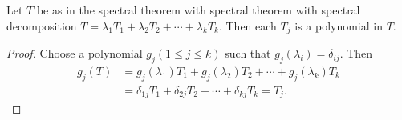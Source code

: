 \begin{corollary}
    Let \( T  \) be as in the spectral theorem with spectral theorem with spectral decomposition \( T = {\lambda}_{1} {T}_{1} + {\lambda}_{2} {T}_{2} + \cdots + {\lambda}_{k} {T}_{k} \). Then each \( {T}_{j} \) is a polynomial in \( T  \).
\end{corollary}
\begin{proof}
Choose a polynomial \( {g}_{j} (1 \leq j \leq k)  \) such that \( {g}_{j}({\lambda}_{i}) = {\delta}_{ij} \). Then 
\begin{align*}
    {g}_{j}(T) &= {g}_{j}({\lambda}_{1}){T}_{1} + {g}_{j}({\lambda}_{2}) {T}_{2} + \cdots + {g}_{j}({\lambda}_{k}) {T}_{k}  \\
               &= {\delta}_{1j} {T}_{1} + {\delta}_{2j} {T}_{2} + \cdots + {\delta}_{kj} {T}_{k} = {T}_{j}.
\end{align*}
\end{proof}
